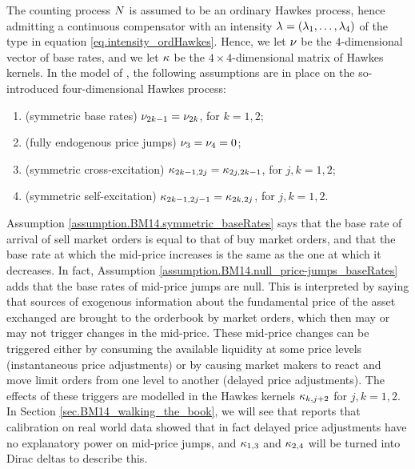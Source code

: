 \documentclass[10pt, article,table]{article}
\begin{document}
The counting process $\multiCountingProc$ is assumed to be an ordinary Hawkes process, hence admitting a continuous compensator with an intensity $\intensity[]=(\intensity[1],\dots,\intensity[4])$ of the type in equation \eqref{eq.intensity_ordHawkes}. Hence, we let $\baseRate$ be the $4$-dimensional vector of base rates, and we let $\hawkesKernel$ be the $4\times4$-dimensional matrix of Hawkes kernels. In the model of \citealp{BM14haw}, the following assumptions are in place on the so-introduced four-dimensional Hawkes process:
\begin{assumption}\label{assumption.BM14}
 \begin{enumerate}[label={\roman{*}.} , ref={\ref{assumption.BM14}.\roman{*}}]
  \item\label{assumption.BM14.symmetric_baseRates} (symmetric base rates)
  $\baseRate_{2k-1}=\baseRate_{2k}$,  for $k=1,2$;
  \item\label{assumption.BM14.null_price-jumps_baseRates} (fully endogenous price jumps) $\baseRate_3 = \baseRate_4=0$;
  \item \label{assumption.BM14.symmetric_cross-excitation}(symmetric cross-excitation)
  $\hawkesKernel_{2k-1,2j}=\hawkesKernel_{2j,2k-1}$, for $j,k=1,2$;
  \item \label{assumption.BM14.symmetric_self-excitation}(symmetric self-excitation)
  $\hawkesKernel_{2k-1,2j-1}=\hawkesKernel_{2k,2j}$, for $j,k=1,2$.
 \end{enumerate}
\end{assumption}
Assumption \ref{assumption.BM14.symmetric_baseRates} says that the base rate of arrival of sell market orders is equal to that of buy market orders, and that the base rate at which the mid-price increases is the same as the one at which it decreases. In fact, Assumption \ref{assumption.BM14.null_price-jumps_baseRates} adds that the base rates of mid-price jumps are null. This is interpreted by saying that sources of exogenous information about the fundamental price of the asset exchanged are brought to the orderbook by market orders, which then may or may not trigger changes in the mid-price. These mid-price changes can be triggered either by consuming the available liquidity at some price levels (instantaneous price adjustments) or by causing market makers to react and move limit orders from one level to another (delayed price adjustments). The effects of these triggers are modelled in the Hawkes kernels $\hawkesKernel_{k,j+2}$ for $j,k=1,2$. In Section \ref{sec.BM14_walking_the_book}, we will see that \citealp{BM14haw} reports that calibration on real world data showed that in fact delayed price adjustments have no explanatory power on mid-price jumps, and $\hawkesKernel_{1,3}$ and $\hawkesKernel_{2,4}$ will be turned into Dirac deltas to describe this.   
\end{document}
